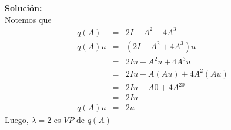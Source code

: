 \documentclass[12pt]{article}
\newenvironment{solucion}
{\begin{mdframed}[backgroundcolor=black!10]
		{\bf Solución:}\\
	}
	{
	\end{mdframed}
}
\newenvironment{preguntas}
{\begin{enumerate}\itemsep12pt
	}
	{
	\end{enumerate}
}
\begin{document}
\begin{preguntas}
\begin{solucion}
		Notemos que
		$$\begin{array}{lcl}
		q(A) & = & 2I - A^2 + 4A^3\\
		q(A) u & = & (2I - A^2 + 4A^3)u\\
		& = & 2Iu - A^2u + 4A^3u \\
		& = & 2Iu - A(Au) + 4A^2(Au) \\
		& = & 2Iu - A0 + 4A^20 \\
		& = & 2Iu \\
		q(A) u & = & 2u
		\end{array}$$
		Luego, $\lambda = 2 $ es $VP$ de $q(A)$
\end{solucion}
\end{preguntas}
\end{document}
